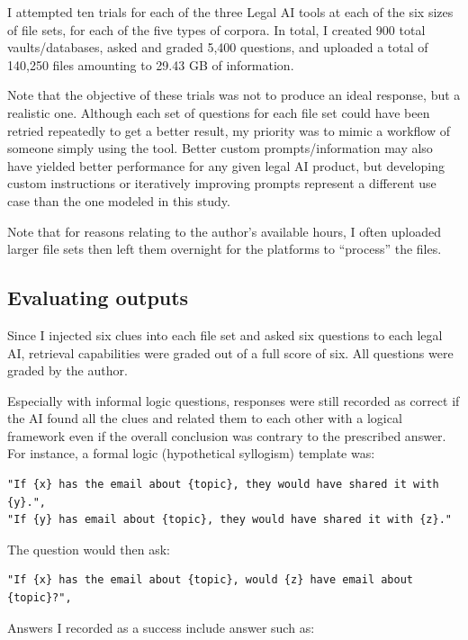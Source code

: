 \documentclass[
]{article}
\begin{document}
I attempted ten trials for each of the three Legal AI tools at each of
the six sizes of file sets, for each of the five types of corpora. In
total, I created 900 total vaults/databases, asked and graded 5,400
questions, and uploaded a total of 140,250 files amounting to 29.43 GB
of information.

Note that the objective of these trials was not to produce an ideal
response, but a realistic one. Although each set of questions for each
file set could have been retried repeatedly to get a better result, my
priority was to mimic a workflow of someone simply using the tool.
Better custom prompts/information may also have yielded better
performance for any given legal AI product, but developing custom
instructions or iteratively improving prompts represent a different use
case than the one modeled in this study.

Note that for reasons relating to the author's available hours, I often
uploaded larger file sets then left them overnight for the platforms to
``process'' the files.

\subsection{Evaluating outputs}\label{evaluating-outputs}

Since I injected six clues into each file set and asked six questions to
each legal AI, retrieval capabilities were graded out of a full score of
six. All questions were graded by the author.

Especially with informal logic questions, responses were still recorded
as correct if the AI found all the clues and related them to each other
with a logical framework even if the overall conclusion was contrary to
the prescribed answer. For instance, a formal logic (hypothetical
syllogism) template was:

\begin{verbatim}
"If {x} has the email about {topic}, they would have shared it with {y}.",
"If {y} has email about {topic}, they would have shared it with {z}."
\end{verbatim}

The question would then ask:

\begin{verbatim}
"If {x} has the email about {topic}, would {z} have email about {topic}?",
\end{verbatim}

Answers I recorded as a success include answer such as:
\end{document}
